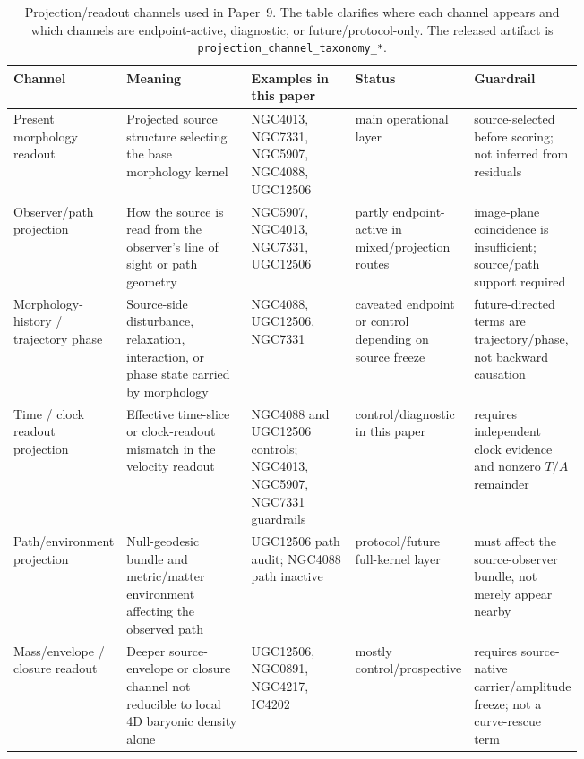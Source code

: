 \documentclass[11pt]{article}
\begin{document}
\begin{table}[H]
\centering
\scriptsize
\setlength{\tabcolsep}{1.8pt}
\begin{tabularx}{\linewidth}{@{}>{\raggedright\arraybackslash}p{0.16\linewidth}>{\raggedright\arraybackslash}p{0.24\linewidth}>{\raggedright\arraybackslash}p{0.20\linewidth}>{\raggedright\arraybackslash}p{0.14\linewidth}X@{}}
\toprule
Channel & Meaning & Examples in this paper & Status & Guardrail \\
\midrule
Present morphology readout &
Projected source structure selecting the base morphology kernel &
NGC4013, NGC7331, NGC5907, NGC4088, UGC12506 &
main operational layer &
source-selected before scoring; not inferred from residuals \\
Observer/path projection &
How the source is read from the observer's line of sight or path geometry &
NGC5907, NGC4013, NGC7331, UGC12506 &
partly endpoint-active in mixed/projection routes &
image-plane coincidence is insufficient; source/path support required \\
Morphology-history / trajectory phase &
Source-side disturbance, relaxation, interaction, or phase state carried by morphology &
NGC4088, UGC12506, NGC7331 &
caveated endpoint or control depending on source freeze &
future-directed terms are trajectory/phase, not backward causation \\
Time / clock readout projection &
Effective time-slice or clock-readout mismatch in the velocity readout &
NGC4088 and UGC12506 controls; NGC4013, NGC5907, NGC7331 guardrails &
control/\allowbreak diagnostic in this paper &
requires independent clock evidence and nonzero \(T/A\) remainder \\
Path/environment projection &
Null-geodesic bundle and metric/matter environment affecting the observed path &
UGC12506 path audit; NGC4088 path inactive &
protocol/future full-kernel layer &
must affect the source-observer bundle, not merely appear nearby \\
Mass/envelope / closure readout &
Deeper source-envelope or closure channel not reducible to local 4D baryonic density alone &
UGC12506, NGC0891, NGC4217, IC4202 &
mostly control/prospective &
requires source-native carrier/amplitude freeze; not a curve-rescue term \\
\bottomrule
\end{tabularx}
\caption{Projection/readout channels used in Paper~9.  The table clarifies
where each channel appears and which channels are endpoint-active, diagnostic,
or future/protocol-only.  The released artifact is
\texttt{projection\_channel\_taxonomy\_*}.}
\label{tab:projection-channel-taxonomy}
\end{table}
\end{document}
